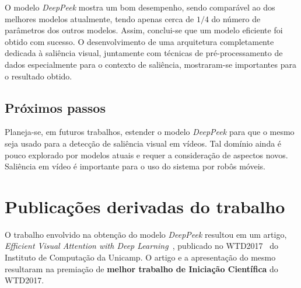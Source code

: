 \documentclass[11pt]{article}
\newcommand{\tit}[1]{\textit{#1}}
\newcommand{\tbf}[1]{\textbf{#1}}
\begin{document}
O modelo \tit{DeepPeek} mostra um bom desempenho, sendo comparável
ao dos melhores modelos atualmente, tendo apenas cerca de $1/4$ do número
de parâmetros dos outros modelos.
Assim, conclui-se que um modelo eficiente foi obtido com sucesso.
O desenvolvimento de uma arquitetura completamente dedicada à saliência visual,
juntamente com técnicas de pré-processamento de dados especialmente para
o contexto de saliência, mostraram-se importantes para o resultado obtido.

\subsection{Próximos passos}
Planeja-se, em futuros trabalhos, estender o modelo \tit{DeepPeek} para
que o mesmo seja usado para a detecção de saliência visual em vídeos.
Tal domínio ainda é pouco explorado por modelos atuais e requer a consideração
de aspectos novos.
Saliência em vídeo é importante para o uso do sistema por robôs móveis.

\section{Publicações derivadas do trabalho}
O trabalho envolvido na obtenção do modelo \tit{DeepPeek} resultou em um
artigo, \tit{Efficient Visual Attention with Deep Learning}~\cite{myarticle},
publicado no WTD2017~\cite{wtd2017} do Instituto de Computação da Unicamp.
O artigo e a apresentação do mesmo resultaram na premiação de
\tbf{melhor trabalho de Iniciação Científica} do WTD2017.

\printbibliography

\end{document}
